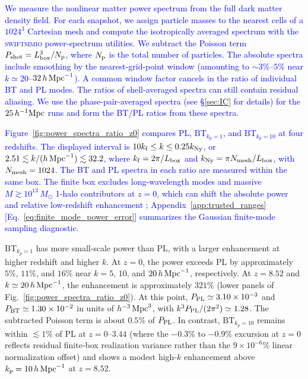 \documentclass[
 reprint,
 superscriptaddress,
 nofootinbib,
 nobibnotes,
 amsmath,
 amssymb,
 aps,
 prd,
 floatfix,
 longbibliography
]{revtex4-2}
\DeclareRobustCommand{\change}[1]{\textcolor{blue}{#1}}
\DeclareRobustCommand{\BTKPone}{\ensuremath{\mathrm{BT}_{k_p=1}}}
\DeclareRobustCommand{\BTKPten}{\ensuremath{\mathrm{BT}_{k_p=10}}}
\begin{document}
\change{We measure the nonlinear matter power spectrum from the full dark matter density field. For each snapshot, we assign particle masses to the nearest cells of a \(1024^3\) Cartesian mesh and compute the isotropically averaged spectrum with the \textsc{swiftsimio} power-spectrum utilities. We subtract the Poisson term \(P_{\rm shot}=L_{\rm box}^3/N_{\rm p}\), where \(N_{\rm p}\) is the total number of particles. The absolute spectra include smoothing by the nearest-grid-point window (amounting to \(\sim3\%\)--\(5\%\) near \(k\simeq20\)--\(32\,h\,{\rm Mpc}^{-1}\)). A common window factor cancels in the ratio of individual BT and PL modes. The ratios of shell-averaged spectra can still contain residual aliasing. We use the phase-pair-averaged spectra \citep{Pontzen2016Inverted} (see \S\ref{sec:IC} for details) for the \(25\,h^{-1}{\rm Mpc}\) runs and form the BT/PL ratios from these spectra.}

\change{Figure~\ref{fig:power_spectra_ratio_z0} compares PL, \BTKPone{}, and \BTKPten{} at four redshifts. The displayed interval is \(10k_{\rm f}\le k\le0.25k_{\rm Ny}\), or \(2.51\lesssim k/(h\,{\rm Mpc}^{-1})\lesssim32.2\), where \(k_{\rm f}=2\pi/L_{\rm box}\) and \(k_{\rm Ny}=\pi N_{\rm mesh}/L_{\rm box}\), with \(N_{\rm mesh}=1024\). The BT and PL spectra in each ratio are measured within the same box. The finite box excludes long-wavelength modes and massive \(M\gtrsim10^{13}\,M_\odot\) 1-halo contributors at \(z=0\), which can shift the absolute power and relative low-redshift enhancement \citep{Takahashi2008FiniteModes}; Appendix~\ref{app:trusted_ranges} [Eq.~\eqref{eq:finite_mode_power_error}] summarizes the Gaussian finite-mode sampling diagnostic.}

\BTKPone{} has more small-scale power than PL, with a larger enhancement at higher redshift and higher \(k\). At \(z=0\), the power exceeds PL by approximately \(5\%\), \(11\%\), and \(16\%\) near \(k=5\), \(10\), and \(20\,h\,{\rm Mpc}^{-1}\), respectively. At \(z=8.52\) and \(k\simeq20\,h\,{\rm Mpc}^{-1}\), the enhancement is approximately \(321\%\) (lower panels of Fig.~\ref{fig:power_spectra_ratio_z0}). At this point, \(P_{\rm PL}\simeq3.10\times10^{-3}\) and \(P_{\rm BT}\simeq1.30\times10^{-2}\) in units of \(h^{-3}\,{\rm Mpc}^3\), with \(k^3P_{\rm PL}/(2\pi^2)\simeq1.28\). The subtracted Poisson term is about \(0.5\%\) of \(P_{\rm PL}\). In contrast, \BTKPten{} remains within \(\lesssim1\%\) of PL at \(z=0\)--\(3.44\) (where the \(-0.3\%\) to \(-0.9\%\) excursion at \(z=0\) reflects residual finite-box realization variance rather than the \(9\times10^{-6}\%\) linear normalization offset) and shows a modest high-\(k\) enhancement above \(k_p=10\,h\,{\rm Mpc}^{-1}\) at \(z=8.52\).
\end{document}
